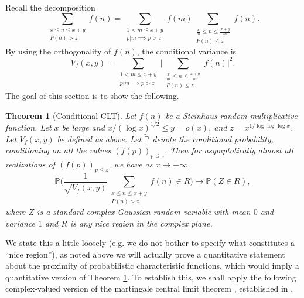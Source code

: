 \documentclass[12pt, notitlepage]{amsart}
\numberwithin{equation}{section}
\def\P{\mathbb P}
\newtheorem{theorem}{Theorem}[section]
\theoremstyle{remark}
\theoremstyle{definition}
\theoremstyle{remark}
\numberwithin{equation}{section}
\begin{document}
 Recall the decomposition 
 \[
 \sum_{\substack{x\le n \le x+y \\ P(n)>z}  } f(n)  =   \sum_{\substack{1<m\le x+y\\ p|m \implies p>z}} f(m)    \sum_{\substack{\frac{x}{m} \le n \le \frac{x+y}{m} \\ P(n)\le z}} f(n).   
  \]
 By using the orthogonality of $f(n)$, the conditional variance is 
 \begin{equation*}
     V_f(x, y) = \sum_{\substack{1<m\le x+y\\ p|m \implies p>z}} \Big| \sum_{\substack{\frac{x}{m} \le n \le \frac{x+y}{m} \\ P(n)\le z}} f(n) \Big|^{2}.
 \end{equation*}
The goal of this section is to show the following.
\begin{theorem}[Conditional CLT]\label{thm: conditionCLT}
     Let $f(n)$ be a Steinhaus random multiplicative function. Let $x$ be large and $x/(\log x)^{1/2}\le y =o(x)$, and $z=x^{1/\log \log \log x}$. Let $V_f(x, y)$ be defined as above.  Let $\widetilde{\P}$ denote the conditional probability, conditioning on all the values $(f(p))_{p\le z}$. Then for asymptotically almost all realizations of $(f(p))_{p\le z}$, we have as $x\to +\infty$,
\[ \widetilde{\P} \Big( \frac{1}{\sqrt{V_f(x, y)}} \sum_{\substack{x\le n \le x+y\\ P(n) > z}}f(n) \in R \Big) \rightarrow \P (Z \in R), \]
where $Z$ is a standard complex Gaussian random variable with mean $0$ and variance $1$ and $R$ is any nice region in the complex plane. 
 \end{theorem}

We state this a little loosely (e.g. we do not bother to specify what constitutes a ``nice region''), as noted above we will actually prove a quantitative statement about the proximity of probabilistic characteristic functions, which would imply a quantitative version of Theorem \ref{thm: conditionCLT}.   To establish this, we shall apply the following complex-valued version of the martingale central limit theorem \cite{McLeish}, established in \cite{SoundXu}.
\end{document}
